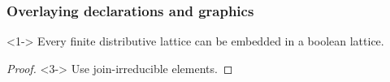 \documentclass{beamer}
\begin{document}
\begin{frame}
\frametitle{Overlaying declarations and graphics}

\begin{theorem}<1->
Every finite distributive lattice can be embedded in a boolean lattice.
\end{theorem}
\begin{proof}<3->
Use join-irreducible elements.
\end{proof}
\end{frame}
\end{document}
